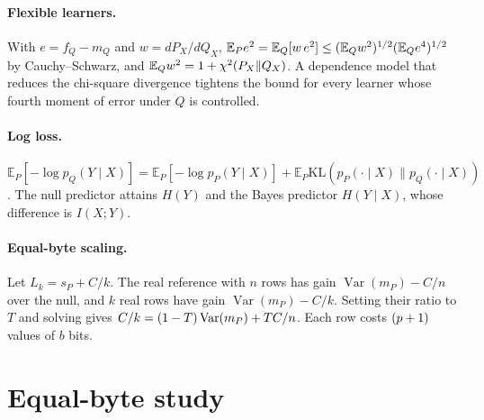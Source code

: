 \documentclass{article}
\newcommand{\E}{\mathbb{E}}
\newcommand{\Var}{\operatorname{Var}}
\newcommand{\Sq}[1]{{#1}^{\Two}}
\begin{document}
\paragraph{Flexible learners.} With $e = f_Q - m_Q$ and $w = dP_X/dQ_X$,
$\E_P\Sq{e} = \E_Q[w\,\Sq{e}] \le (\E_Q\Sq{w})^{\One/\Two} (\E_Q e^{\Four})^{\One/\Two}$ by Cauchy--Schwarz,
and $\E_Q\Sq{w} = \One + \chi^{\Two}(P_X\|Q_X)$. A dependence model that reduces the chi-square divergence
tightens the bound for every learner whose fourth moment of error under $Q$ is controlled.

\paragraph{Log loss.} $\E_P[-\log p_Q(Y\mid X)] = \E_P[-\log p_P(Y\mid X)] + \E_P \mathrm{KL}(p_P(\cdot\mid X)\|p_Q(\cdot\mid X))$.
The null predictor attains $H(Y)$ and the Bayes predictor $H(Y\mid X)$, whose difference is $I(X;Y)$.

\paragraph{Equal-byte scaling.} Let $L_k = s_P + C/k$. The real reference with $n$ rows has gain
$\Var(m_P) - C/n$ over the null, and $k$ real rows have gain $\Var(m_P) - C/k$. Setting their ratio to $T$
and solving gives $C/k = (\One - T)\Var(m_P) + T C/n$. Each row costs $(p + 1)$ values of $b$ bits.

\section{Equal-byte study}
\label{app:equal}
\end{document}

